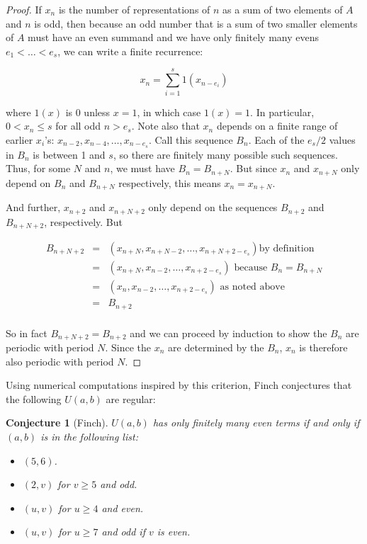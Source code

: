 \documentclass{report}
\newtheorem{conjecture}[theorem]{Conjecture}
\theoremstyle{remark}
\numberwithin{equation}{section}
\begin{document}
\begin{proof}

  If $x_n$ is the number of representations of $n$ as a sum of two
  elements of $A$ and $n$ is odd, then because an odd number that is a
  sum of two smaller elements of $A$ must have an even summand and we
  have only finitely many evens $e_1 < \ldots < e_s$, we can write a
  finite recurrence:

  \[x_n = \sum_{i=1}^s 1(x_{n-e_i})\]
  
  where $1(x)$ is 0 unless $x = 1$, in which case $1(x) = 1$.  In
  particular, $0 < x_n \leq s$ for all odd $n > e_s$.  Note also that
  $x_n$ depends on a finite range of earlier $x_i$'s:
  $x_{n-2}, x_{n-4}, \ldots, x_{n-e_s}$.  Call this sequence $B_n$.
  Each of the $e_s/2$ values in $B_n$ is between 1 and $s$, so there
  are finitely many possible such sequences.  Thus, for some $N$ and
  $n$, we must have $B_n = B_{n+N}$.  But since $x_n$ and $x_{n+N}$
  only depend on $B_n$ and $B_{n+N}$ respectively, this means
  $x_n = x_{n+N}$.

  And further, $x_{n+2}$ and $x_{n+N+2}$ only depend on the sequences
  $B_{n+2}$ and $B_{n+N+2}$, respectively.  But 

  \begin{eqnarray*}
    B_{n+N+2} &=& (x_{n+N}, x_{n+N-2}, \ldots, x_{n+N+2-e_s}) \text{
    by definition}\\
    &=& (x_{n+N}, x_{n-2}, \ldots, x_{n+2-e_s}) \text{ because $B_n
                                                  = B_{n+N}$}\\
    &=& (x_{n}, x_{n-2}, \ldots, x_{n+2-e_s}) \text{ as noted
                                                above}\\
              &=& B_{n+2}\\
  \end{eqnarray*}

  So in fact $B_{n+N+2} = B_{n+2}$ and we can proceed by induction to
  show the $B_n$ are periodic with period $N$.  Since the $x_n$ are
  determined by the $B_n$, $x_n$ is therefore also periodic with
  period $N$.
\end{proof}

Using numerical computations inspired by this criterion, Finch
conjectures \cite{finch:em1992} that the following $U(a,b)$ are
regular:

\begin{conjecture}[Finch]
  $U(a,b)$ has only finitely many even terms if and only if $(a,b)$ is
  in the following list:

\begin{itemize}
\item $(5,6)$.
\item $(2,v)$ for $v \geq 5$ and odd.
\item $(u,v)$ for $u \geq 4$ and even.
\item $(u,v)$ for $u \geq 7$ and odd if $v$ is even.
\end{itemize}
\end{conjecture}
\end{document}

